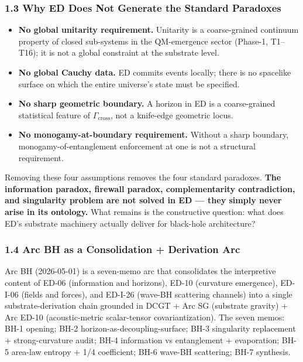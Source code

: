 \documentclass[
  11pt,
  a4paper,
]{article}
\providecommand{\tightlist}{%
  \setlength{\itemsep}{0pt}\setlength{\parskip}{0pt}}
\begin{document}
\subsubsection{1.3 Why ED Does Not Generate the Standard
Paradoxes}\label{why-ed-does-not-generate-the-standard-paradoxes}

\begin{itemize}
\tightlist
\item
  \textbf{No global unitarity requirement.} Unitarity is a
  coarse-grained continuum property of closed sub-systems in the
  QM-emergence sector (Phase-1, T1--T16); it is not a global constraint
  at the substrate level.
\item
  \textbf{No global Cauchy data.} ED commits events locally; there is no
  spacelike surface on which the entire universe's state must be
  specified.
\item
  \textbf{No sharp geometric boundary.} A horizon in ED is a
  coarse-grained statistical feature of \(\Gamma_\mathrm{cross}\), not a
  knife-edge geometric locus.
\item
  \textbf{No monogamy-at-boundary requirement.} Without a sharp
  boundary, monogamy-of-entanglement enforcement at one is not a
  structural requirement.
\end{itemize}

Removing these four assumptions removes the four standard paradoxes.
\textbf{The information paradox, firewall paradox, complementarity
contradiction, and singularity problem are not solved in ED --- they
simply never arise in its ontology.} What remains is the constructive
question: what does ED's substrate machinery actually deliver for
black-hole architecture?

\subsubsection{1.4 Arc BH as a Consolidation + Derivation
Arc}\label{arc-bh-as-a-consolidation-derivation-arc}

Arc BH (2026-05-01) is a seven-memo arc that consolidates the
interpretive content of ED-06 (information and horizons), ED-10
(curvature emergence), ED-I-06 (fields and forces), and ED-I-26 (wave-BH
scattering channels) into a single substrate-derivation chain grounded
in DCGT + Arc SG (substrate gravity) + Arc ED-10 (acoustic-metric
scalar-tensor covariantization). The seven memos: BH-1 opening; BH-2
horizon-as-decoupling-surface; BH-3 singularity replacement +
strong-curvature audit; BH-4 information vs entanglement + evaporation;
BH-5 area-law entropy + 1/4 coefficient; BH-6 wave-BH scattering; BH-7
synthesis.
\end{document}
